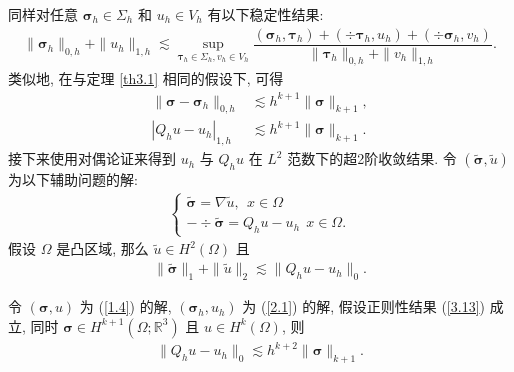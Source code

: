 	同样对任意 $\boldsymbol\sigma_h\in\Sigma_h$ 和 $u_h\in V_h$ 有以下稳定性结果:
		\begin{align}
			\label{3.9}
			\|\boldsymbol\sigma_h\|_{0,h}+\|u_h\|_{1,h}\lesssim\sup_{\boldsymbol\tau_h\in \Sigma_h, v_h\in V_h}\dfrac{(\boldsymbol\sigma_h, \boldsymbol\tau_h)+(\div\boldsymbol\tau_h, u_h)+(\div\boldsymbol\sigma_h, v_h)}{\|\boldsymbol\tau_h\|_{0,h}+\|v_h\|_{1,h}}.
		\end{align}
	类似地, 在与定理 \ref{th3.1} 相同的假设下, 可得
	\begin{align}
		\label{3.10}
		\|\boldsymbol\sigma-\boldsymbol\sigma_h\|_{0,h}&\lesssim h^{k+1}\|\boldsymbol\sigma\|_{k+1},\\
		\label{3.11}
		|Q_h u-u_h|_{1,h}&\lesssim h^{k+1}\|\boldsymbol\sigma\|_{k+1}.
	\end{align}
	接下来使用对偶论证来得到 $u_h$ 与 $Q_h u$ 在 $L^2$ 范数下的超2阶收敛结果.
	令 $(\widetilde{\boldsymbol{\sigma}}, \widetilde{u})$ 为以下辅助问题的解:
	\begin{align}
		\label{3.12}
		\left\{
		\begin{array}{ll}
			\widetilde{\boldsymbol{\sigma}} = \nabla\widetilde{u}, \ \ x\in \Omega\\
			-\div\widetilde{\boldsymbol{\sigma}} = Q_h u-u_h \ \ x\in \Omega.
		\end{array}
		\right.
	\end{align}
	假设 $\Omega$ 是凸区域, 那么 $\widetilde{u}\in H^2(\Omega)$ 且
	\begin{align}
		\label{3.13}
		\|\widetilde{\boldsymbol{\sigma}}\|_1+\|\widetilde{u}\|_2\lesssim\|Q_h u-u_h\|_0.
	\end{align}
	\begin{theorem}
		令 $(\boldsymbol\sigma, u)$ 为 (\ref{1.4}) 的解, $(\boldsymbol\sigma_h, u_h)$ 为 (\ref{2.1}) 的解, 假设正则性结果 (\ref{3.13}) 成立, 同时 $\boldsymbol\sigma\in H^{k+1}(\Omega;\mathbb{R}^3)$ 且 $u\in H^{k}(\Omega)$, 则
		\begin{align}
			\label{3.14}
			\|Q_h u-u_h\|_0\lesssim h^{k+2}\|\boldsymbol\sigma\|_{k+1}.
		\end{align}
	\end{theorem}
